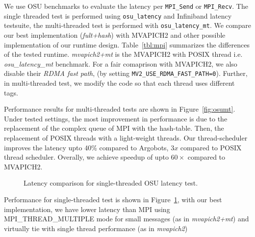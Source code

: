 We use OSU benchmarks \cite{osubench} to evaluate the latency per
\texttt{MPI_Send} or \texttt{MPI_Recv}. The single threaded test is performed
using \texttt{osu_latency} and Infiniband latency testsuite, the multi-threaded
test is performed with \texttt{osu_latency_mt}. We compare our best
implementation (\textit{fult+hash}) with MVAPICH2 and other possible
implementation of our runtime design. Table~\ref{tbl:mpi} summarizes the
differences of the tested runtime.  \textit{mvapich2+mt} is the MVAPICH2 with
POSIX thread i.e. \textit{osu_latency_mt} benchmark. For a fair comaprison with
MVAPICH2, we also disable their \textit{RDMA fast path}, (by setting
\texttt{MV2_USE_RDMA_FAST_PATH=0}). Further, in multi-threaded test, we modify
the code so that each thread uses different tags.

Performance results for multi-threaded tests are shown in
Figure~\ref{fig:osumt}.  Under tested settings, the most improvement in
performance is due to the replacement of the complex queue of MPI with the
hash-table.  Then, the replacement of POSIX threads with a light-weight
threads. Our thread-scheduler improves the latency upto 40\% compared to
Argobots, $3x$ compared to POSIX thread scheduler. Overally, we achieve
speedup of upto $60\times$ compared to MVAPICH2.

\begin{figure}
  \centering
  \caption{Latency comparison for single-threaded OSU latency test.\label{fig:osu-single}}
\end{figure}

Performance for single-threaded test is shown in Figure~\ref{fig:osu-single},
with our best implementation, we have lower latency than MPI using
MPI_THREAD_MULTIPLE mode for small messages (as in
\textit{mvapich2+mt}) and virtually tie with single thread performance (as in
\textit{mvapich2}) 
